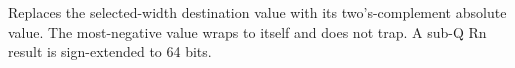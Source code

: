 Replaces the selected-width destination value with its two's-complement absolute value. The most-negative value wraps to itself and does not trap. A sub-Q Rn result is sign-extended to 64 bits.
